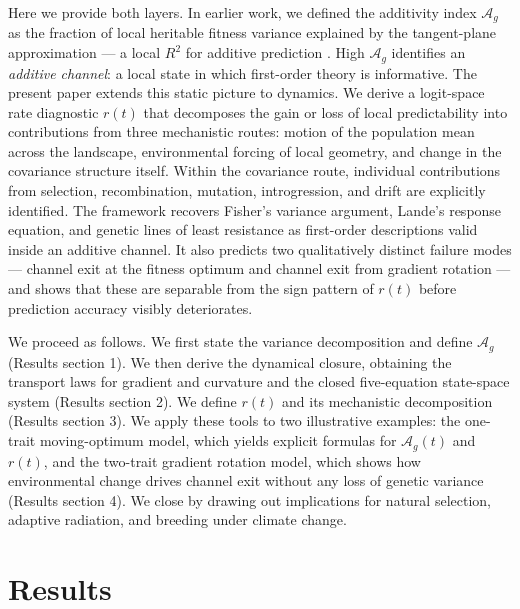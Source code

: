 \documentclass[9pt,twocolumn,twoside]{pnas-new}
\newcommand{\Ag}{\mathcal{A}_{g}}
\begin{document}
Here we provide both layers.
In earlier work, we defined the additivity index $\Ag$ as the
fraction of local heritable fitness variance explained by the
tangent-plane approximation --- a local $R^2$ for additive
prediction \cite{OrtizBarrientosCooper2026}.
High $\Ag$ identifies an \emph{additive channel}: a local state
in which first-order theory is informative.
The present paper extends this static picture to dynamics.
We derive a logit-space rate diagnostic $r(t)$ that decomposes the
gain or loss of local predictability into contributions from three
mechanistic routes: motion of the population mean across the
landscape, environmental forcing of local geometry, and
change in the covariance structure itself.
Within the covariance route, individual contributions from
selection, recombination, mutation, introgression, and drift
are explicitly identified.
The framework recovers Fisher's variance argument, Lande's response
equation, and genetic lines of least resistance as first-order
descriptions valid inside an additive channel.
It also predicts two qualitatively distinct failure modes ---
channel exit at the fitness optimum and channel exit from gradient
rotation --- and shows that these are separable from the sign
pattern of $r(t)$ before prediction accuracy visibly deteriorates.

We proceed as follows.
We first state the variance decomposition and define $\Ag$ (Results
section 1).
We then derive the dynamical closure, obtaining the transport laws
for gradient and curvature and the closed five-equation state-space
system (Results section 2).
We define $r(t)$ and its mechanistic decomposition (Results
section 3).
We apply these tools to two illustrative examples: the one-trait
moving-optimum model, which yields explicit formulas for $\Ag(t)$
and $r(t)$, and the two-trait gradient rotation model, which shows
how environmental change drives channel exit without any loss of
genetic variance (Results section 4).
We close by drawing out implications for natural selection,
adaptive radiation, and breeding under climate change.

\section*{Results}
\end{document}
